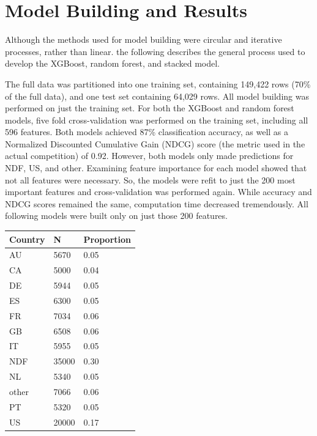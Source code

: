 \documentclass{article}
\begin{document}
\section{Model Building and Results}

Although the methods used for model building were circular and iterative processes, rather than linear. the following describes the general process used to develop the XGBoost, random forest, and stacked model. 


The full data was partitioned into one training set, containing 149,422 rows (70\% of the full data), and one 
test set containing 64,029 rows. All model building was performed on just the training set. For both the XGBoost 
and random forest models, five fold cross-validation was performed on the training set, including all 596 features. 
Both models achieved 87\% classification accuracy, as well as a Normalized Discounted Cumulative Gain (NDCG) score 
(the metric used in the actual competition) of 0.92. However, both models only made predictions for NDF, US, and 
other. Examining feature importance for each model showed that not all features were necessary. So, the models were 
refit to just the 200 most important features and cross-validation was performed again. While accuracy and NDCG
scores remained the same, computation time decreased tremendously. All following models were built only on just those 
200 features. 

\begin{table}[ht]
\centering
\begin{tabular}{| l | l | l |}
  \hline
  \textbf{Country} & \textbf{N} & \textbf{Proportion} \\ 
  \hline
  AU & 5670 & 0.05 \\ 
  CA & 5000 & 0.04 \\ 
  DE & 5944 & 0.05 \\ 
  ES & 6300 & 0.05 \\ 
  FR & 7034 & 0.06 \\ 
  GB & 6508 & 0.06 \\ 
  IT & 5955 & 0.05 \\ 
  NDF & 35000 & 0.30 \\ 
  NL & 5340 & 0.05 \\ 
  other & 7066 & 0.06 \\ 
  PT & 5320 & 0.05 \\ 
  US & 20000 & 0.17 \\ 
   \hline
\end{tabular}
\label{table:smote}
\end{table}
\end{document}
